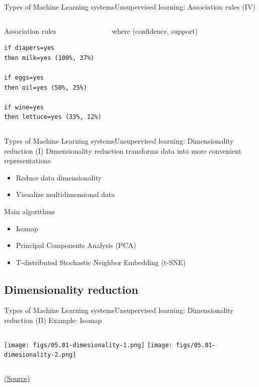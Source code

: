 \documentclass[10pt,compress]{beamer} %
\begin{document}
\begin{frame}[fragile]{Types of Machine Learning systems}{Unsupervised learning: Association rules (IV)}
    \begin{columns}
	   		\begin{exampleblock}{Association rules}
	   		\begin{lstlisting}[firstnumber=1, xleftmargin=10pt] 
if diapers=yes
then milk=yes (100%, 37%)

if eggs=yes
then oil=yes (50%, 25%)

if wine=yes
then lettuce=yes (33%, 12%)
           \end{lstlisting}
	   		\end{exampleblock}

 		where (confidence, support)
	\end{columns}
\end{frame}

\begin{frame}{Types of Machine Learning systems}{Unsupervised learning: Dimensionality reduction (I)}
	Dimensionality reduction transforms data into more convenient representations
	\begin{itemize}
		\item Reduce data dimensionality
		\item Visualize multidimensional data
	\end{itemize}

	Main algorithms
	\begin{itemize}
		\item Isomap
		\item Principal Components Analysis (PCA)
		\item T-distributed Stochastic Neighbor Embedding (t-SNE)
	\end{itemize}
\end{frame}

\subsection{Dimensionality reduction}
\begin{frame}[fragile]{Types of Machine Learning systems}{Unsupervised learning: Dimensionality reduction (II)}
	Example: Isomap

    \begin{columns}
			\texttt{[image: figs/05.01-dimesionality-1.png]}
			\texttt{[image: figs/05.01-dimesionality-2.png]}
    \end{columns}
    \centering \tiny{\href{https://jakevdp.github.io/PythonDataScienceHandbook/05.01-what-is-machine-learning.html}{(Source)}}

\end{frame}
\end{document}
